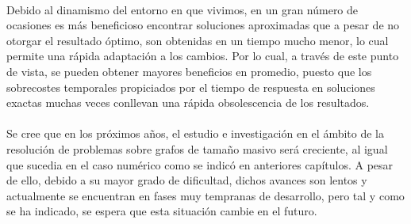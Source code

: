 \documentclass{subfiles}
\begin{document}
      \paragraph{}
      Debido al dinamismo del entorno en que vivimos, en un gran número de ocasiones es más beneficioso encontrar soluciones aproximadas que a pesar de no otorgar el resultado óptimo, son obtenidas en un tiempo mucho menor, lo cual permite una rápida adaptación a los cambios. Por lo cual, a través de este punto de vista, se pueden obtener mayores beneficios en promedio, puesto que los sobrecostes temporales propiciados por el tiempo de respuesta en soluciones exactas muchas veces conllevan una rápida obsolescencia de los resultados.

      \paragraph{}
      Se cree que en los próximos años, el estudio e investigación en el ámbito de la resolución de problemas sobre grafos de tamaño masivo será creciente, al igual que sucedia en el caso numérico como se indicó en anteriores capítulos. A pesar de ello, debido a su mayor grado de dificultad, dichos avances son lentos y actualmente se encuentran en fases muy tempranas de desarrollo, pero tal y como se ha indicado, se espera que esta situación cambie en el futuro.
\end{document}
